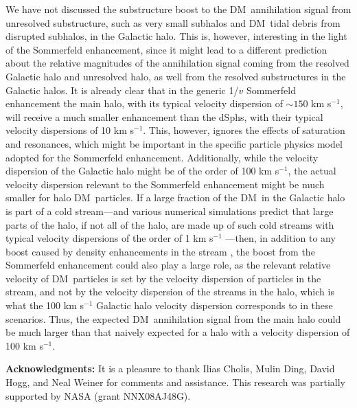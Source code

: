 \documentclass[aps,prd,twocolumn,amsmath,amssymb,floatfix,nofootinbib,10pt]{revtex4}
\newcommand{\DM}{DM}
\newcommand{\dSphs}{dSphs}
\begin{document}
We have not discussed the substructure boost to the \DM\ annihilation
signal from unresolved substructure, such as very small subhalos and
\DM\ tidal debris from disrupted subhalos, in the Galactic halo. This
is, however, interesting in the light of the Sommerfeld enhancement,
since it might lead to a different prediction about the relative
magnitudes of the annihilation signal coming from the resolved
Galactic halo and unresolved halo, as well from the resolved
substructures in the Galactic halos. It is already clear that in the
generic 1/$v$ Sommerfeld enhancement the main halo, with its typical
velocity dispersion of $\sim\!150$ km s$^{-1}$, will receive a much
smaller enhancement than the \dSphs, with their typical velocity
dispersions of 10 km s$^{-1}$. This, however, ignores the effects of
saturation and resonances, which might be important in the specific
particle physics model adopted for the Sommerfeld
enhancement. Additionally, while the velocity dispersion of the
Galactic halo might be of the order of 100 km s$^{-1}$, the actual
velocity dispersion relevant to the Sommerfeld enhancement might be
much smaller for halo \DM\ particles. If a large fraction of the \DM\
in the Galactic halo is part of a cold stream---and various numerical
simulations predict that large parts of the halo, if not all of the
halo, are made up of such cold streams with typical velocity
dispersions of the order of 1 km s$^{-1}$
\cite{1999MNRAS.307..495H,2003MNRAS.339..834H}---then, in addition to
any boost caused by density enhancements in the stream
\cite{2008arXiv0811.1582A}, the boost from the Sommerfeld enhancement
could also play a large role, as the relevant relative velocity of
\DM\ particles is set by the velocity dispersion of particles in the
stream, and not by the velocity dispersion of the streams in the halo,
which is what the 100 km s$^{-1}$ Galactic halo velocity dispersion
corresponds to in these scenarios. Thus, the expected \DM\
annihilation signal from the main halo could be much larger than that
naively expected for a halo with a velocity dispersion of 100 km
s$^{-1}$.

{\bf Acknowledgments:} It is a pleasure to thank Ilias Cholis, Mulin
Ding, David Hogg, and Neal Weiner for comments and assistance. This
research was partially supported by NASA (grant NNX08AJ48G).




\end{document}
